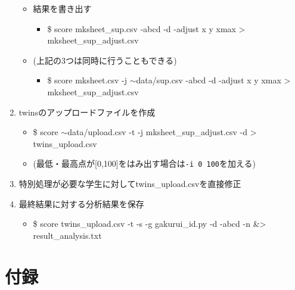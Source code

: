 \begin{enumerate}
\begin{itemize}
\begin{itemize}
\end{itemize}

\item 結果を書き出す

\begin{itemize}
\item \$ score mksheet\_sup.csv -abcd -d -adjust x y xmax > mksheet\_sup\_adjust.csv

\end{itemize}

\item (上記の3つは同時に行うこともできる)

\begin{itemize}
\item \$ score mksheet.csv -j \ensuremath{\sim}data\slash sup.csv -abcd -d -adjust x y xmax > mksheet\_sup\_adjust.csv

\end{itemize}

\end{itemize}

\item twinsのアップロードファイルを作成

\begin{itemize}
\item \$ score \ensuremath{\sim}data\slash upload.csv -t -j mksheet\_sup\_adjust.csv -d > twins\_upload.csv

\item (最低・最高点が{[0,100]}をはみ出す場合は\texttt{-i 0 100}を加える)

\end{itemize}

\item 特別処理が必要な学生に対してtwins\_upload.csvを直接修正

\item 最終結果に対する分析結果を保存

\begin{itemize}
\item \$ score twins\_upload.csv -t -s -g gakurui\_id.py -d -abcd -n \&> result\_analysis.txt

\end{itemize}

\end{enumerate}

\section{付録}
\label{付録}

